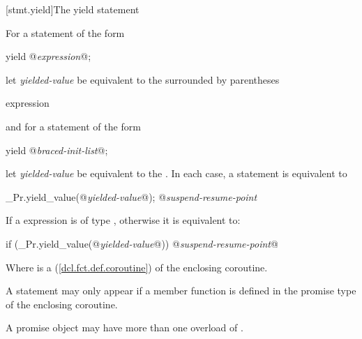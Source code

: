 %

[stmt.yield]{The yield statement}%

\pnum
For a  statement of the form

\begin{codeblock}
  yield @\textit{expression}@;
\end{codeblock}

let \textit{yielded-value} be equivalent to the  surrounded
by parentheses

\begin{ncbnf}
  \terminal{(} expression \terminal{)}
\end{ncbnf}

and for a  statement of the form

\begin{codeblock}
  yield @\textit{braced-init-list}@;
\end{codeblock}

let \textit{yielded-value} be equivalent to the . In each case,
a  statement is equivalent to

\begin{codeblock}
  _Pr.yield_value(@\textit{yielded-value}@);
  @\textit{suspend-resume-point}
\end{codeblock}

If a  expression is of type , otherwise it is equivalent to:

\begin{codeblock}
  if (_Pr.yield_value(@\textit{yielded-value}@)) {
    @\textit{suspend-resume-point}@
  }
\end{codeblock}

Where  is a  (\ref{dcl.fct.def.coroutine}) of the enclosing coroutine.

\pnum
A  statement may only appear if a  member
function is defined in the promise type of the enclosing coroutine.

\pnum
A promise object may have more than one overload of .

